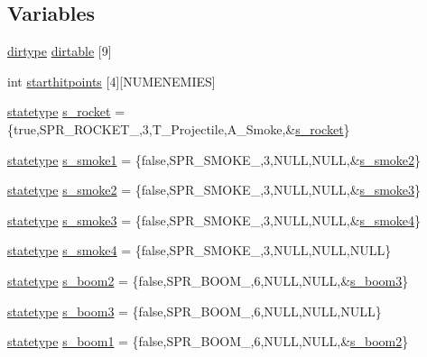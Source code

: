 \subsection*{Variables}
\begin{DoxyCompactItemize}
\item 
\hyperlink{WL__DEF_8H_a04ddebf7fd2f3611173b2d219f4ec05f}{dirtype} \hyperlink{WL__ACT2_8C_a4dfa6f1f625ea98fc62700c2de6c7498}{dirtable} \mbox{[}9\mbox{]}
\item 
int \hyperlink{WL__ACT2_8C_abc6fe4c11f70870645f3e16028f40ee7}{starthitpoints} \mbox{[}4\mbox{]}\mbox{[}NUMENEMIES\mbox{]}
\item 
\hyperlink{structstatestruct}{statetype} \hyperlink{WL__ACT2_8C_ae7f0b57b9f3953da2e6880dc2c2f8680}{s\_\-rocket} = \{true,SPR\_\-ROCKET\_,3,T\_\-Projectile,A\_\-Smoke,\&\hyperlink{WL__ACT2_8C_ae7f0b57b9f3953da2e6880dc2c2f8680}{s\_\-rocket}\}
\item 
\hyperlink{structstatestruct}{statetype} \hyperlink{WL__ACT2_8C_a9735e94026b7e564dd85a52ce7ac19ae}{s\_\-smoke1} = \{false,SPR\_\-SMOKE\_,3,NULL,NULL,\&\hyperlink{WL__ACT2_8C_a22fa7750c99c09569a35abfc704e4570}{s\_\-smoke2}\}
\item 
\hyperlink{structstatestruct}{statetype} \hyperlink{WL__ACT2_8C_a22fa7750c99c09569a35abfc704e4570}{s\_\-smoke2} = \{false,SPR\_\-SMOKE\_,3,NULL,NULL,\&\hyperlink{WL__ACT2_8C_a4872fe791b812aa34d2b5d249ada1e48}{s\_\-smoke3}\}
\item 
\hyperlink{structstatestruct}{statetype} \hyperlink{WL__ACT2_8C_a4872fe791b812aa34d2b5d249ada1e48}{s\_\-smoke3} = \{false,SPR\_\-SMOKE\_,3,NULL,NULL,\&\hyperlink{WL__ACT2_8C_a86fab02d9f5f61e77001e7532ae09e94}{s\_\-smoke4}\}
\item 
\hyperlink{structstatestruct}{statetype} \hyperlink{WL__ACT2_8C_a86fab02d9f5f61e77001e7532ae09e94}{s\_\-smoke4} = \{false,SPR\_\-SMOKE\_,3,NULL,NULL,NULL\}
\item 
\hyperlink{structstatestruct}{statetype} \hyperlink{WL__ACT2_8C_a4b62a61a47a79b9290d9ed071767a114}{s\_\-boom2} = \{false,SPR\_\-BOOM\_,6,NULL,NULL,\&\hyperlink{WL__ACT2_8C_ab9fc861cc2aa3e8ad7c565874cc9cdda}{s\_\-boom3}\}
\item 
\hyperlink{structstatestruct}{statetype} \hyperlink{WL__ACT2_8C_ab9fc861cc2aa3e8ad7c565874cc9cdda}{s\_\-boom3} = \{false,SPR\_\-BOOM\_,6,NULL,NULL,NULL\}
\item 
\hyperlink{structstatestruct}{statetype} \hyperlink{WL__ACT2_8C_a2a21a352d91ec680c37549be54df1e45}{s\_\-boom1} = \{false,SPR\_\-BOOM\_,6,NULL,NULL,\&\hyperlink{WL__ACT2_8C_a4b62a61a47a79b9290d9ed071767a114}{s\_\-boom2}\}

\end{DoxyCompactItemize}
